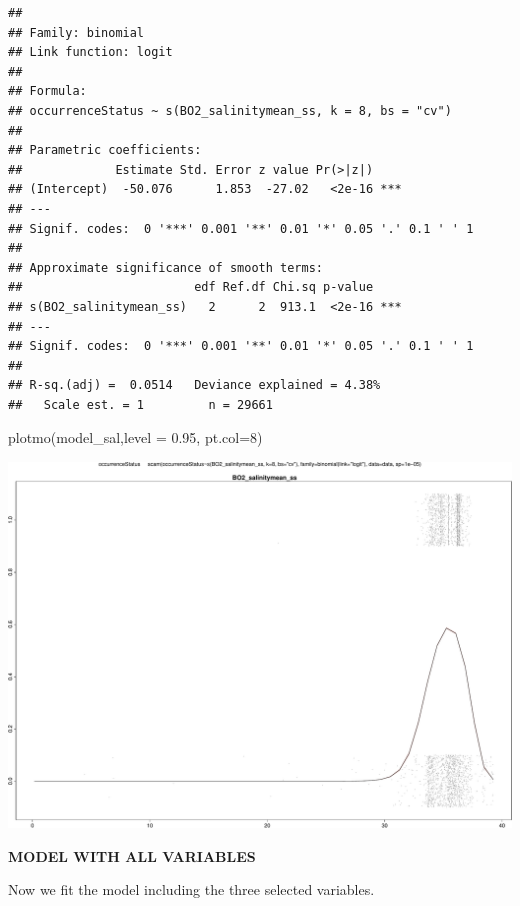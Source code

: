 \documentclass[
]{book}
\newenvironment{Shaded}{\begin{snugshade}}{\end{snugshade}}
\newcommand{\AttributeTok}[1]{\textcolor[rgb]{0.77,0.63,0.00}{#1}}
\newcommand{\DecValTok}[1]{\textcolor[rgb]{0.00,0.00,0.81}{#1}}
\newcommand{\FloatTok}[1]{\textcolor[rgb]{0.00,0.00,0.81}{#1}}
\newcommand{\FunctionTok}[1]{\textcolor[rgb]{0.00,0.00,0.00}{#1}}
\newcommand{\NormalTok}[1]{#1}
\begin{document}
\begin{verbatim}
## 
## Family: binomial 
## Link function: logit 
## 
## Formula:
## occurrenceStatus ~ s(BO2_salinitymean_ss, k = 8, bs = "cv")
## 
## Parametric coefficients:
##             Estimate Std. Error z value Pr(>|z|)    
## (Intercept)  -50.076      1.853  -27.02   <2e-16 ***
## ---
## Signif. codes:  0 '***' 0.001 '**' 0.01 '*' 0.05 '.' 0.1 ' ' 1
## 
## Approximate significance of smooth terms:
##                        edf Ref.df Chi.sq p-value    
## s(BO2_salinitymean_ss)   2      2  913.1  <2e-16 ***
## ---
## Signif. codes:  0 '***' 0.001 '**' 0.01 '*' 0.05 '.' 0.1 ' ' 1
## 
## R-sq.(adj) =  0.0514   Deviance explained = 4.38%
##   Scale est. = 1         n = 29661
\end{verbatim}

\begin{Shaded}
\begin{Highlighting}[]
\FunctionTok{plotmo}\NormalTok{(model\_sal,}\AttributeTok{level =} \FloatTok{0.95}\NormalTok{, }\AttributeTok{pt.col=}\DecValTok{8}\NormalTok{)}
\end{Highlighting}
\end{Shaded}

\includegraphics{_main_files/figure-latex/unnamed-chunk-63-1.pdf}

\textbf{MODEL WITH ALL VARIABLES}

Now we fit the model including the three selected variables.
\end{document}
